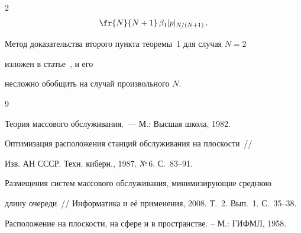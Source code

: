 \begin{multicols}{2}
\begin{multline*}
\fr{N}{N+1}\,\beta_1 |p|_{N/(N+1)}\,.


\end{multline*}





\smallskip


Метод доказательства второго пункта теоремы~1 для случая $N=2$


изложен в статье~\cite{3za}, и его


несложно обобщить на случай произвольного $N$.








{\small\frenchspacing


{%




\begin{thebibliography}{9}









Теория массового обслуживания.~--- М.: Высшая школа, 1982.









Оптимизация расположения станций обслуживания на плоскости~//


Изв. АН СССР. Техн. киберн., 1987. №\,6. С.~83--91.











Размещения систем массового обслуживания, минимизирующие среднюю


длину очереди~// Информатика и её применения, 2008. Т.~2. Вып.~1. С.~35--38.





\label{end\stat}









Расположение на плоскости, на сфере и в пространстве. -- М.: ГИФМЛ, 1958.








\end{thebibliography}





}


}


\end{multicols}


